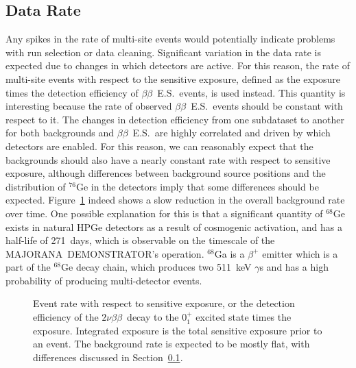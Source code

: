 \documentclass[notitlepage,rmp,aps,10pt]{revtex4-1}
\newcommand{\MJ}{M{\footnotesize AJORANA}}
\newcommand{\Demo}{D{\footnotesize EMON\-STRAT\-OR}}
\newcommand{\MJD}{\MJ\ \Demo}
\newcommand{\bb}{${\beta \beta}$}
\newcommand{\tnbb}{${2 \nu \beta \beta}$}
\newcommand{\bbes}{\bb~E.S.}
\newcommand{\iso}[2]{$^{#1}$#2}
\newcommand{\Ge}[1]{\iso{#1}{Ge}}
\newcommand{\SP}[3]{$#1^{#2}_{#3}$}
\begin{document}
\subsection{Data Rate} \label{sec:ratecheck}
Any spikes in the rate of multi-site events would potentially indicate problems with run selection or data cleaning.
Significant variation in the data rate is expected due to changes in which detectors are active.
For this reason, the rate of multi-site events with respect to the sensitive exposure, defined as the exposure times the detection efficiency of \bbes\ events, is used instead.
This quantity is interesting because the rate of observed \bbes\ events should be constant with respect to it.
The changes in detection efficiency from one subdataset to another for both backgrounds and \bbes\ are highly correlated and driven by which detectors are enabled.
For this reason, we can reasonably expect that the backgrounds should also have a nearly constant rate with respect to sensitive exposure, although differences between background source positions and the distribution of \Ge{76} in the detectors imply that some differences should be expected.
Figure~\ref{fig:eventrate} indeed shows a slow reduction in the overall background rate over time.
One possible explanation for this is that a significant quantity of \Ge{68} exists in natural HPGe detectors as a result of cosmogenic activation, and has a half-life of 271~days, which is observable on the timescale of the \MJD's operation.
\iso{68}{Ga} is a $\beta^+$ emitter which is a part of the \Ge{68} decay chain, which produces two 511~keV $\gamma$s and has a high probability of producing multi-detector events.
\begin{figure}[ht]
  \centering
  \caption{\label{fig:eventrate}
    Event rate with respect to sensitive exposure, or the detection efficiency of the \tnbb\ decay to the \SP{0}{+}{1} excited state times the exposure. Integrated exposure is the total sensitive exposure prior to an event. The background rate is expected to be mostly flat, with differences discussed in Section~\ref{sec:ratecheck}.
  }
\end{figure}
\end{document}
